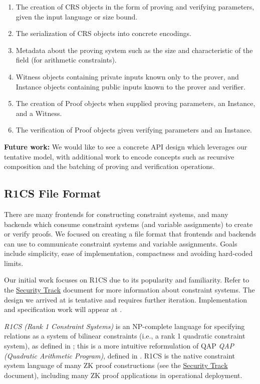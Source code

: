 \begin{enumerate}
 \item The creation of CRS objects in the form of proving and verifying parameters, given the input language or size bound.
 \item The serialization of CRS objects into concrete encodings.
 \item Metadata about the proving system such as the size and characteristic of the field (for arithmetic constraints).
 \item Witness objects containing private inputs known only to the prover, and Instance objects containing public inputs known to the prover and verifier.
 \item The creation of Proof objects when supplied proving parameters, an Instance, and a Witness.
 \item The verification of Proof objects given verifying parameters and an Instance.
\end{enumerate}

\textbf{Future work:} 
We would like to see a concrete API design which leverages our tentative model, with additional work to encode concepts such as recursive composition and the batching of proving and verification operations.


\subsection{R1CS File Format}

There are many frontends for constructing constraint systems, and many backends which consume constraint systems (and variable assignments) to create or verify proofs. We focused on creating a file format that frontends and backends can use to communicate constraint systems and variable assignments. Goals include simplicity, ease of implementation, compactness and avoiding hard-coded limits.

Our initial work focuses on R1CS due to its popularity and familiarity. 
Refer to the \hyperref[chap:track-security]{Security Track} document for more information about constraint systems. 
The design we arrived at is tentative and requires further iteration. 
Implementation and specification work will appear at .


\emph{R1CS (Rank 1 Constraint Systems)} is an NP-complete language for specifying relations as a system of bilinear constraints (i.e., a rank 1 quadratic constraint system), 
as defined in \cite[Appendix E in extended version]{2013:crypto:SNARKs-for-C}; %
this is a more intuitive reformulation of QAP \emph{QAP (Quadratic Arithmetic Program)}, 
defined in \cite{2013:SP:Pinocchio}. %
R1CS is the native constraint system language of many ZK proof constructions (see the \hyperref[chap:track-security]{Security Track} document), including many ZK proof applications in operational deployment.


